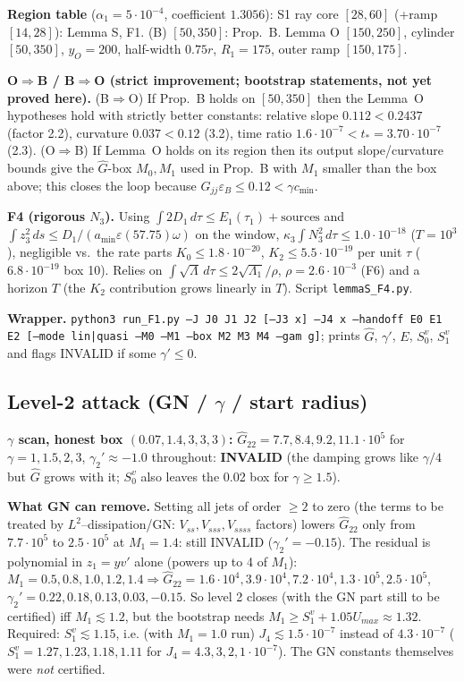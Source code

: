 \documentclass[11pt]{article}
\begin{document}
\textbf{Region table} ($\alpha_1=5\cdot10^{-4}$, coefficient $1.3056$): 
S1 ray core $[28,60]$ (+ramp $[14,28]$): Lemma S, F1. 
(B) $[50,350]$: Prop.~B. 
Lemma O $[150,250]$, cylinder $[50,350]$, $y_O=200$, half-width $0.75r$, $R_1=175$, outer ramp $[150,175]$.

\textbf{O$\Rightarrow$B / B$\Rightarrow$O (strict improvement; bootstrap statements, not yet proved here).} (B$\Rightarrow$O) If Prop.~B holds on $[50,350]$ then the Lemma~O hypotheses hold with strictly better constants: relative slope $0.112<0.2437$ (factor 2.2), curvature $0.037<0.12$ (3.2), time ratio $1.6\cdot10^{-7}<t_*=3.70\cdot10^{-7}$ (2.3). (O$\Rightarrow$B) If Lemma~O holds on its region then its output slope/curvature bounds give the $\hat G$-box $M_0,M_1$ used in Prop.~B with $M_1$ smaller than the box above; this closes the loop because $\hat G_{jj}\varepsilon_B\le0.12<\gamma c_{\min}$.

\textbf{F4 (rigorous $N_3$).} Using $\int2D_1\,d\tau\le E_1(\tau_1)+\text{sources}$ and $\int z_3^2\,ds\le D_1/(a_{\min}\varepsilon(57.75)\omega)$ on the window, $\kappa_3\int N_3^2\,d\tau\le1.0\cdot10^{-18}$ ($T=10^3$), negligible vs.\ the rate parts $K_0\le1.8\cdot10^{-20}$, $K_2\le5.5\cdot10^{-19}$ per unit $\tau$ ($6.8\cdot10^{-19}$ box 10). Relies on $\int\!\sqrt\Lambda\,d\tau\le2\sqrt{\Lambda_1}/\rho$, $\rho=2.6\cdot10^{-3}$ (F6) and a horizon $T$ (the $K_2$ contribution grows linearly in $T$). Script \texttt{lemmaS\_F4.py}.

\textbf{Wrapper.} \texttt{python3 run\_F1.py --J J0 J1 J2 [--J3 x] --J4 x --handoff E0 E1 E2 [--mode lin|quasi --M0 --M1 --box M2 M3 M4 --gam g]}; prints $\hat G$, $\gamma'$, $E$, $S_0^v$, $S_1^v$ and flags INVALID if some $\gamma'\le0$.

\subsection*{Level-2 attack (GN / $\gamma$ / start radius)}
\textbf{$\gamma$ scan, honest box $(0.07,1.4,3,3,3)$:} $\hat G_{22}=7.7,8.4,9.2,11.1\cdot10^5$ for $\gamma=1,1.5,2,3$, $\gamma_2'\approx-1.0$ throughout: \textbf{INVALID} (the damping grows like $\gamma/4$ but $\hat G$ grows with it; $S_0^v$ also leaves the 0.02 box for $\gamma\ge1.5$).

\textbf{What GN can remove.} Setting all jets of order $\ge2$ to zero (the terms to be treated by $L^2$--dissipation/GN: $V_{ss},V_{sss},V_{ssss}$ factors) lowers $\hat G_{22}$ only from $7.7\cdot10^5$ to $2.5\cdot10^5$ at $M_1=1.4$: still INVALID ($\gamma_2'=-0.15$). The residual is polynomial in $z_1=yv'$ alone (powers up to 4 of $M_1$): $M_1=0.5,0.8,1.0,1.2,1.4\Rightarrow\hat G_{22}=1.6\cdot10^4,3.9\cdot10^4,7.2\cdot10^4,1.3\cdot10^5,2.5\cdot10^5$, $\gamma_2'=0.22,0.18,0.13,0.03,-0.15$. So level 2 closes (with the GN part still to be certified) iff $M_1\lesssim1.2$, but the bootstrap needs $M_1\ge S_1^v+1.05U_{max}\approx1.32$. Required: $S_1^v\lesssim1.15$, i.e. (with $M_1=1.0$ run) $J_4\lesssim1.5\cdot10^{-7}$ instead of $4.3\cdot10^{-7}$ ($S_1^v=1.27,1.23,1.18,1.11$ for $J_4=4.3,3,2,1\cdot10^{-7}$). The GN constants themselves were \emph{not} certified.
\end{document}
